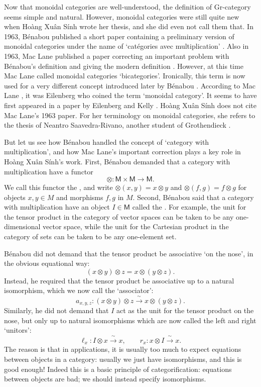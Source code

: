 \documentclass[reqno]{amsart}
\newcommand{\maps}{\colon}    %
\newcommand{\M}{{\mathsf{M}}}   %
\newcommand{\define}[1]{\textbf{\boldmath{#1}}}
\theoremstyle{definition}
\begin{document}
Now that monoidal categories are well-understood, the definition of Gr-category seems simple and natural.   However, monoidal categories were still quite new when Ho\`ang Xu\^an S\'inh wrote her thesis, and she did even not call them that.  In 1963, B\'enabou published a short paper containing a preliminary version of monoidal categories under the name of `cat\'egories avec multiplication' \cite{B63}.   Also in 1963, Mac Lane published a paper correcting an important problem with B\'enabou's definition and giving the modern definition  \cite{M63}.  However, at this time Mac Lane called monoidal categories `bicategories'.  Ironically, this term is now used for a very different concept introduced later by B\'enabou \cite{B67}.   According to Mac Lane \cite{M13}, it was Eilenberg who coined the term `monoidal category'.  It seems to have first appeared in a paper by Eilenberg and Kelly \cite{EK}.   Ho\`ang Xu\^an S\'inh does not cite Mac Lane's 1963 paper.  For her terminology on monoidal categories, she refers to the thesis of Neantro Saavedra-Rivano, another student of Grothendieck \cite{SR70,SR72}.

But let us see how B\'enabou handled the concept of `category with multiplication', and how Mac Lane's important correction plays a key role in Ho\`ang Xu\^an S\'inh's work.   First, B\'enabou demanded that a category with multiplication have a functor
\[           \otimes \colon \M \times \M \to \M. \]
We call this functor the \define{tensor product}, and write $\otimes(x,y)=x \otimes y$ and $\otimes(f,g)=f \otimes g$
for objects $x, y \in M$ and morphisms $f, g$ in $M$.  Second, B\'enabou said that a category with multiplication have an object $I \in \M$ called the \define{unit}.  For example, the unit for the tensor product in the category of vector spaces can be taken to be any one-dimensional vector space, while the unit for the Cartesian product in the category of sets can be taken to be any one-element set.  

B\'enabou did not demand that the tensor product be
associative `on the nose', in the obvious equational way:
\[         (x \otimes y) \otimes z = x \otimes (y \otimes z) .\]
Instead, he required that the tensor product be associative up to a natural isomorphism, which we now call the `associator':
\[     a_{x,y,z} \maps (x \otimes y) \otimes z \xrightarrow{\;\sim\;} x \otimes (y \otimes z)  .\]
Similarly, he did not demand that $I$ act as the unit for
the tensor product on the nose, but only up to natural isomorphisms
which are now called the left and right `unitors':
\[       \ell_x \maps I \otimes x \xrightarrow{\;\sim\;} x  , \qquad
            r_x \maps x \otimes I \xrightarrow{\;\sim\;} x  .\]
The reason is that in applications, it is usually too much to
expect equations between objects in a category: usually we just
have isomorphisms, and this is good enough!  Indeed this is a
basic principle of categorification: equations between objects are
bad; we should instead specify isomorphisms.
\end{document}
